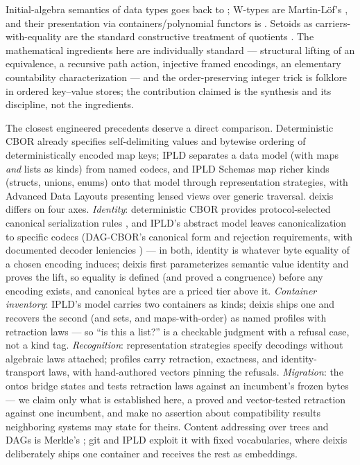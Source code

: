 \documentclass[11pt]{article}
\theoremstyle{definition}
\begin{document}
Initial-algebra semantics of data types goes back to \cite{gtw}; W-types are
Martin-L\"of's \cite{martinlof}, and their presentation via containers/polynomial
functors is \cite{aag}. Setoids as carriers-with-equality are the standard
constructive treatment of quotients \cite{hofmann}. The mathematical ingredients here
are individually standard --- structural lifting of an equivalence, a recursive path
action, injective framed encodings, an elementary countability characterization ---
and the order-preserving integer trick is folklore in ordered key--value stores;
the contribution claimed is the synthesis and its discipline, not the ingredients.

The closest engineered precedents deserve a direct comparison. Deterministic CBOR
\cite{rfc8949} already specifies self-delimiting values and bytewise ordering of
deterministically encoded map keys; IPLD \cite{ipldcodec} separates a data model
(with maps \emph{and} lists as kinds) from named codecs, and IPLD Schemas
\cite{ipldschema} map richer kinds (structs, unions, enums) onto that model through
representation strategies, with Advanced Data Layouts presenting lensed views over
generic traversal. deixis differs on four axes. \emph{Identity}: deterministic CBOR provides
protocol-selected canonical serialization rules \cite{rfc8949}, and IPLD's abstract
model leaves canonicalization to specific codecs (DAG-CBOR's canonical form and
rejection requirements, with documented decoder leniencies \cite{dagcbor}) --- in
both, identity is whatever byte equality of a chosen encoding induces; deixis first
parameterizes semantic value identity and proves the lift, so equality is defined (and
proved a congruence) before any encoding exists, and canonical bytes are a priced
tier above it. \emph{Container inventory}: IPLD's model carries two containers as
kinds; deixis ships one and recovers the second (and sets, and maps-with-order) as
named profiles with retraction laws --- so ``is this a list?'' is a checkable
judgment with a refusal case, not a kind tag. \emph{Recognition}: representation
strategies specify decodings without algebraic laws attached; profiles carry
retraction, exactness, and identity-transport laws, with hand-authored vectors
pinning the refusals. \emph{Migration}: the ontos bridge states and tests retraction
laws against an incumbent's frozen bytes --- we claim only what is established here,
a proved and vector-tested retraction against one incumbent, and make no assertion
about compatibility results neighboring systems may state for theirs. Content
addressing over trees and DAGs is Merkle's \cite{merkle}; git
and IPLD exploit it with fixed vocabularies, where deixis deliberately ships one
container and receives the rest as embeddings.
\end{document}
